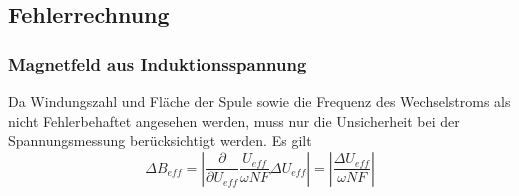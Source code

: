 \subsection{Fehlerrechnung}
\subsubsection{Magnetfeld aus Induktionsspannung}
Da Windungszahl und Fläche der Spule sowie die Frequenz des Wechselstroms als nicht Fehlerbehaftet angesehen werden, muss nur die Unsicherheit bei der Spannungsmessung berücksichtigt werden. Es gilt 
\begin{equation}
	\Delta B_{eff} = \left|\frac{\partial }{\partial U_{eff}} \frac{U_{eff}}{\omega NF} \Delta U_{eff}\right| = \left|\frac{\Delta U_{eff}}{\omega N F}\right|
\end{equation}
